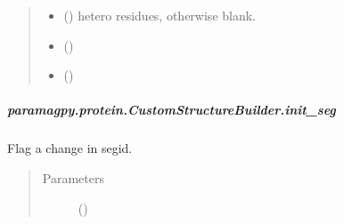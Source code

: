 \documentclass[a4paper,10pt,english,openany,oneside]{sphinxmanual}
\begin{document}
\begin{fulllineitems}
\begin{fulllineitems}
\begin{fulllineitems}
\begin{quote}
\begin{description}
\begin{itemize}
\item {} 
\sphinxstyleliteralstrong{\sphinxupquote{, }}\sphinxstyleliteralstrong{\sphinxupquote{, }} (\sphinxstyleliteralemphasis{\sphinxupquote{-}}) \textendash{} hetero residues, otherwise blank.

\item {} 
\sphinxstyleliteralstrong{\sphinxupquote{, }} (\sphinxstyleliteralemphasis{\sphinxupquote{-}}) \textendash{} 

\item {} 
\sphinxstyleliteralstrong{\sphinxupquote{, }} (\sphinxstyleliteralemphasis{\sphinxupquote{-}}) \textendash{} 

\end{itemize}

\end{description}\end{quote}

\end{fulllineitems}



\subparagraph{paramagpy.protein.CustomStructureBuilder.init\_seg}
\label{\detokenize{reference/generated/paramagpy.protein.CustomStructureBuilder.init_seg:paramagpy-protein-customstructurebuilder-init-seg}}\label{\detokenize{reference/generated/paramagpy.protein.CustomStructureBuilder.init_seg::doc}}

\begin{fulllineitems}
\label{\detokenize{reference/generated/paramagpy.protein.CustomStructureBuilder.init_seg:paramagpy.protein.CustomStructureBuilder.init_seg}}
Flag a change in segid.
\begin{quote}\begin{description}
\item[{Parameters}] \leavevmode
{} (\sphinxstyleliteralemphasis{\sphinxupquote{-}}) \textendash{} 


\end{description}
\end{quote}
\end{fulllineitems}
\end{fulllineitems}
\end{fulllineitems}
\end{document}
